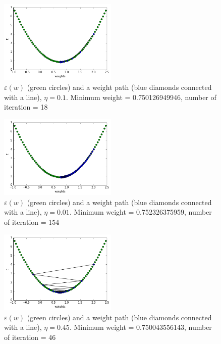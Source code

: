 \documentclass[a4paper, 12pt]{article}
\begin{document}
\begin{figure}[h]
  \centering
  \caption{$\varepsilon(w)$ (green circles) and a weight path (blue diamonds connected with a line), $\eta = 0.1$. Minimum weight = 0.750126949946, number of iteration = 18 \label{fig:EFunction01}}
  \includegraphics[width=0.5\textwidth]{EFunction01}
\end{figure}

\begin{figure}[h]
  \centering
  \caption{$\varepsilon(w)$ (green circles) and a weight path (blue diamonds connected with a line), $\eta = 0.01$. Minimum weight = 0.752326375959, number of iteration = 154 \label{fig:EFunction001}}
  \includegraphics[width=0.5\textwidth]{EFunction001}
\end{figure}

\begin{figure}[h]
  \centering
  \caption{$\varepsilon(w)$ (green circles) and a weight path (blue diamonds connected with a line), $\eta = 0.45$. Minimum weight = 0.750043556143, number of iteration = 46  \label{fig:EFunction045}}
  \includegraphics[width=0.5\textwidth]{EFunction045}
\end{figure}
\end{document}
